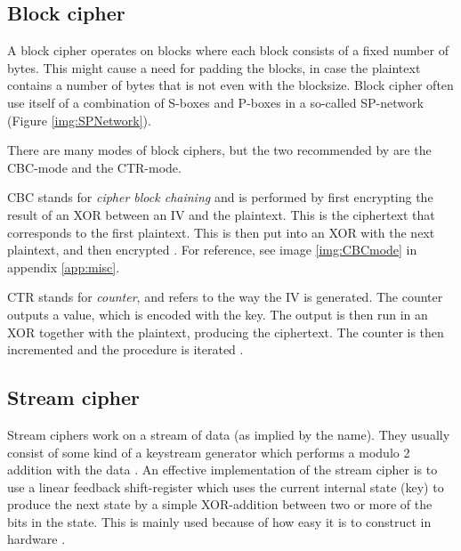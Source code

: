 \subsection{Block cipher}\label{sec:BlockCipher}
A block cipher operates on blocks where each block consists of a fixed number 
of bytes. This might cause a need for padding the blocks, in case the plaintext 
contains a number of bytes that is not even with the blocksize. Block cipher 
often use itself of a combination of S-boxes and P-boxes in a so-called 
SP-network (Figure \ref{img:SPNetwork}).

There are many modes of block ciphers, but the two recommended by 
\citet{Schneier:2003} are the CBC-mode and the CTR-mode.

CBC stands for \emph{cipher block chaining} and is performed by first encrypting 
the result of an XOR between an IV and the plaintext. This is the ciphertext 
that corresponds to the first plaintext. This is then put into an XOR with the 
next plaintext, and then encrypted \citep[pp. 109--111]{Stinson:2006}. For 
reference, see image \ref{img:CBCmode} in appendix \ref{app:misc}.

CTR stands for \emph{counter}, and refers to the way the IV is generated. The
counter outputs a value, which is encoded with the key. The output is then run 
in an XOR together with the plaintext, producing the ciphertext. The counter is 
then incremented and the procedure is iterated \citep[p. 111]{Stinson:2006}.

\subsection{Stream cipher} \label{sec:StreamCipher}
Stream ciphers work on a stream of data (as implied by the name). They usually 
consist of some kind of a keystream generator which performs a modulo 2 addition
with the data \cite[pp. 67]{Simmons:1992}. An effective implementation of the 
stream cipher is to use a linear feedback shift-register which uses the current 
internal state (key) to produce the next state by a simple XOR-addition between 
two or more of the bits in the state. This is mainly used because of how easy
it is to construct in hardware \citep{LFSR:2008}.



